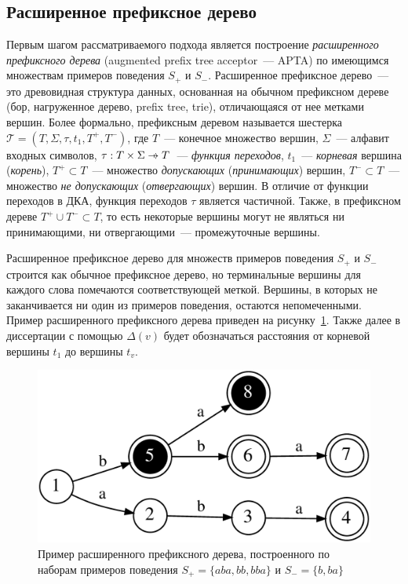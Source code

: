 
\subsection{Расширенное префиксное дерево}
\label{sec:review:sat-dfa-inf:apta}


Первым шагом рассматриваемого подхода является построение \emph{расширенного префиксного дерева} (augmented prefix tree acceptor~{---} APTA) по имеющимся множествам примеров поведения $S_{+}$ и $S_{-}$. 
Расширенное префиксное дерево~--- это древовидная структура данных, основанная на обычном префиксном дереве (бор, нагруженное дерево, prefix tree, trie), отличающаяся от нее метками вершин.
Более формально, префиксным деревом называется шестерка $\mathcal{T} = \left(T,\Sigma,\tau,t_{1},T^{+}, T^{-}\right)$, где $T$~{---} конечное множество вершин, $\Sigma$~{---} алфавит входных символов, $\tau: T \times \Sigma \pto T$~{---} \emph{функция переходов}, $t_{1}$~{---} \emph{корневая} вершина (\emph{корень}), $T^{+} \subset T$~{---} множество \emph{допускающих} (\emph{принимающих}) вершин, $T^{-} \subset T$~{---} множество \emph{не допускающих} (\emph{отвергающих}) вершин.
В отличие от функции переходов в ДКА, функция переходов $\tau$ является частичной. 
Также, в префиксном дереве $T^{+} \cup T^{-} \subset T$, то есть некоторые вершины могут не являться ни принимающими, ни отвергающими~--- промежуточные вершины.

Расширенное префиксное дерево для множеств примеров поведения $S_{+}$ и $S_{-}$ строится как обычное префиксное дерево, но терминальные вершины для каждого слова помечаются соответствующей меткой. Вершины, в которых не заканчивается ни один из примеров поведения, остаются непомеченными. Пример расширенного префиксного дерева приведен на рисунку~\ref{img:apta-ex}.
Также далее в диссертации с помощью $\Delta(v)$ будет обозначаться расстояния от корневой вершины $t_{1}$ до вершины $t_{v}$.

\begin{figure}[ht]
  \centering
  \includegraphics[scale=0.14]{img/datamod/FIG2a.eps}
  \caption{Пример расширенного префиксного дерева, построенного по наборам примеров поведения $S_{+} = \{aba, bb, bba\}$ и $S_{-} = \{b, ba\}$}
  \label{img:apta-ex}
\end{figure}


